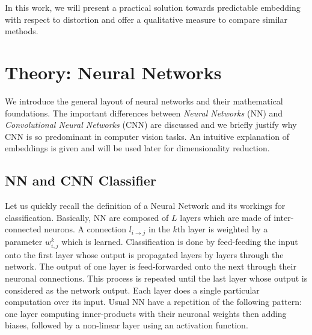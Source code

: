 \documentclass[a4paper,12pt]{report}
\begin{document}
In this work, we will present a practical solution towards predictable embedding with respect to distortion and offer a qualitative measure to compare similar methods. %


\chapter{Theory: Neural Networks}
We introduce the general layout of neural networks and their mathematical foundations.
The important differences between {\em Neural Networks} (NN) and {\em Convolutional Neural Networks} (CNN) are discussed and we briefly justify why CNN is so predominant in computer vision tasks.
An intuitive explanation of embeddings is given and will be used later for dimensionality reduction.

\section{NN and CNN Classifier}

Let us quickly recall the definition of a Neural Network and its workings for classification.
Basically, NN are composed of $L$ layers which are made of inter-connected neurons.
A connection $l_{i \rightarrow j}$ in the $k$th layer is weighted by a parameter $w^k_{i,j}$ which is learned.
Classification is done by feed-feeding the input onto the first layer whose output is propagated layers by layers through the network.
The output of one layer is feed-forwarded onto the next through their neuronal connections.
This process is repeated until the last layer whose output is considered as the network output.
Each layer does a single particular computation over its input.
Usual NN have a repetition of the following pattern: one layer computing inner-products with their neuronal weights then adding biases, followed by a non-linear layer using an activation function.
\end{document}
